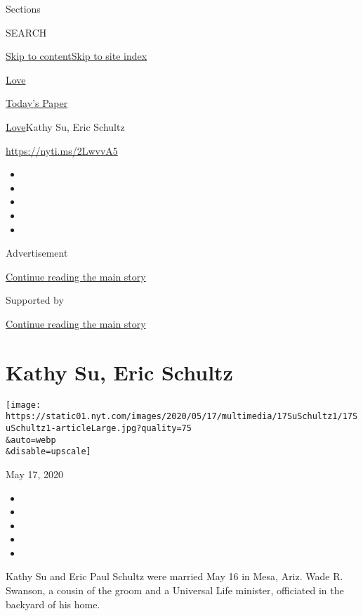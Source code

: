 Sections

SEARCH

\protect\hyperlink{site-content}{Skip to
content}\protect\hyperlink{site-index}{Skip to site index}

\href{https://www.nytimes.com/section/fashion/weddings}{Love}

\href{https://myaccount.nytimes.com/auth/login?response_type=cookie\&client_id=vi}{}

\href{https://www.nytimes.com/section/todayspaper}{Today's Paper}

\href{/section/fashion/weddings}{Love}\textbar{}Kathy Su, Eric Schultz

\url{https://nyti.ms/2LwvvA5}

\begin{itemize}
\item
\item
\item
\item
\item
\end{itemize}

Advertisement

\protect\hyperlink{after-top}{Continue reading the main story}

Supported by

\protect\hyperlink{after-sponsor}{Continue reading the main story}

\hypertarget{kathy-su-eric-schultz}{%
\section{Kathy Su, Eric Schultz}\label{kathy-su-eric-schultz}}

\texttt{[image: https://static01.nyt.com/images/2020/05/17/multimedia/17SuSchultz1/17SuSchultz1-articleLarge.jpg?quality=75\\\&auto=webp\\\&disable=upscale]}

May 17, 2020

\begin{itemize}
\item
\item
\item
\item
\item
\end{itemize}

Kathy Su and Eric Paul Schultz were married May 16 in Mesa, Ariz. Wade
R. Swanson, a cousin of the groom and a Universal Life minister,
officiated in the backyard of his home.

